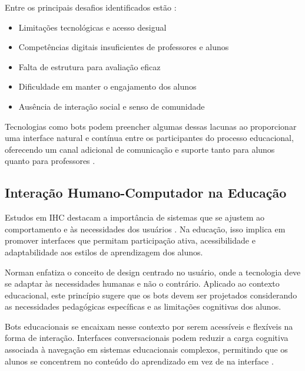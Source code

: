 \noindent Entre os principais desafios identificados estão \cite{fabiane2024}:

\begin{itemize}
\item Limitações tecnológicas e acesso desigual
\item Competências digitais insuficientes de professores e alunos
\item Falta de estrutura para avaliação eficaz
\item Dificuldade em manter o engajamento dos alunos
\item Ausência de interação social e senso de comunidade
\end{itemize}

\noindent Tecnologias como bots podem preencher algumas dessas lacunas ao proporcionar uma interface natural e contínua entre os participantes do processo educacional, oferecendo um canal adicional de comunicação e suporte tanto para alunos quanto para professores \cite{winkler2018}.


\subsection{Interação Humano-Computador na Educação}
\label{subsec:ihc}

Estudos em IHC destacam a importância de sistemas que se ajustem ao comportamento e às necessidades dos usuários \cite{roy1987}. Na educação, isso implica em promover interfaces que permitam participação ativa, acessibilidade e adaptabilidade aos estilos de aprendizagem dos alunos.

Norman \cite{norman2013} enfatiza o conceito de design centrado no usuário, onde a tecnologia deve se adaptar às necessidades humanas e não o contrário. Aplicado ao contexto educacional, este princípio sugere que os bots devem ser projetados considerando as necessidades pedagógicas específicas e as limitações cognitivas dos alunos.

Bots educacionais se encaixam nesse contexto por serem acessíveis e flexíveis na forma de interação. Interfaces conversacionais podem reduzir a carga cognitiva associada à navegação em sistemas educacionais complexos, permitindo que os alunos se concentrem no conteúdo do aprendizado em vez de na interface \cite{sweller2011}.


